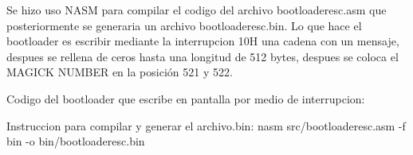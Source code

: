 \documentclass[12pt, a4paper]{report}
\begin{document}
\bigskip
\bigskip



\begin{center}
Se hizo uso NASM para compilar el codigo del archivo bootloaderesc.asm que posteriormente se generaria un archivo bootloaderesc.bin. Lo que hace el bootloader es escribir mediante la interrupcion 10H una cadena con un mensaje, despues se rellena de ceros hasta una longitud de 512 bytes, despues se coloca el MAGICK NUMBER en la posición 521 y 522.

\bigskip
\bigskip

\begin{flushleft}
Codigo del bootloader que escribe en pantalla por medio de interrupcion:

\bigskip
\bigskip


\end{flushleft}

\bigskip
\bigskip

\end{center}
\begin{center}

\bigskip
\bigskip

\newpage

Instruccion para compilar y generar el archivo.bin: nasm src/bootloaderesc.asm -f bin -o  bin/bootloaderesc.bin

\bigskip
\end{center}
\end{document}
